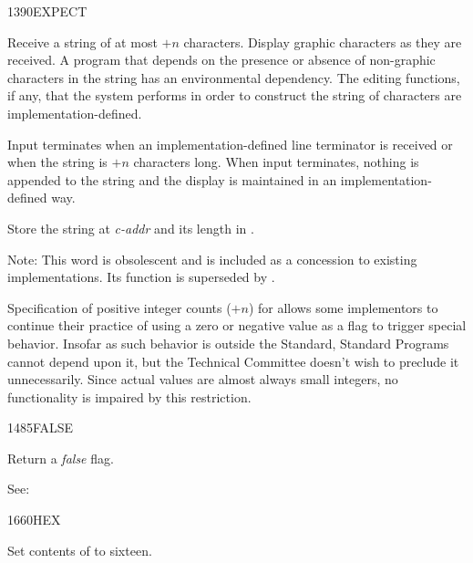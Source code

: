 \begin{newword}{1390}{EXPECT}

	Receive a string of at most $+n$ characters. Display graphic
	characters as they are received. A program that depends on
	the presence or absence of non-graphic characters in the
	string has an environmental dependency. The editing functions,
	if any, that the system performs in order to construct the
	string of characters are implementation-defined.

	Input terminates when an implementation-defined line terminator
	is received or when the string is $+n$ characters long. When
	input terminates, nothing is appended to the string and the
	display is maintained in an implementation-defined way.

	Store the string at \emph{c-addr} and its length in .

\item[Note:]
	This word is obsolescent and is included as a concession to
	existing implementations. Its function is superseded
	by .

	\begin{rationale} %
		Specification of positive integer counts ($+n$) for
		 allows some implementors to continue their
		practice of using a zero or negative value as a flag to
		trigger special behavior. Insofar as such behavior is outside
		the Standard, Standard Programs cannot depend upon it, but
		the Technical Committee doesn't wish to preclude it
		unnecessarily. Since actual values are almost always small
		integers, no functionality is impaired by this restriction.
	\end{rationale}
\end{newword}


\begin{newword}{1485}{FALSE}

	Return a \emph{false} flag.

\item[See:]
\end{newword}


\begin{newword}{1660}{HEX}
	\stack{}{}

	Set contents of  to sixteen.
\end{newword}


